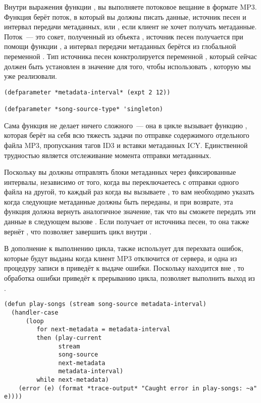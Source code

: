 Внутри выражения  функции , вы выполняете потоковое
вещание в формате MP3.  Функция  берёт поток, в который вы должны писать
данные, источник песен и интервал передачи метаданных, или , если клиент не
хочет получать метаданные.  Поток~--- это сокет, полученный из объекта ,
источник песен получается при помощи функции , а интервал передачи
метаданных берётся из глобальной переменной .  Тип источника
песен конктролируется переменной , который сейчас должен быть
установлен в значение  для того, чтобы использовать
, которую мы уже реализовали.

\begin{lstlisting}
(defparameter *metadata-interval* (expt 2 12))

(defparameter *song-source-type* 'singleton)
\end{lstlisting}

Сама функция  не делает ничего сложного~--- она в цикле вызывает функцию
, которая берёт на себя всю тяжесть задачи по отправке содержимого
отдельного файла MP3, пропускания тагов ID3 и вставки метаданных ICY.  Единственной
трудностью является отслеживание момента отправки метаданных.

Поскольку вы должны отправлять блоки метаданных через фиксированные интервалы, независимо
от того, когда вы переключаетесь с отправки одного файла на другой, то каждый раз когда вы
вызываете , то вам необходимо указать когда следующие метаданные должны
быть переданы, и при возврате, эта функция должна вернуть аналогичное значение, так что вы
сможете передать эти данные в следующем вызове .  Если
 получает  от источника песен, то она также вернёт
, что позволяет завершить цикл  внутри .

В дополнение к выполнению цикла,  также использует 
для перехвата ошибок, которые будут выданы когда клиент MP3 отключится от сервера, и одна
из процедуру записи в  приведёт к выдаче ошибки. Поскольку
 находится вне , то обработка ошибки приведёт к прерыванию
цикла, позволяет выполнить выход из .

\begin{lstlisting}
(defun play-songs (stream song-source metadata-interval)
  (handler-case 
      (loop
         for next-metadata = metadata-interval
         then (play-current 
               stream 
               song-source
               next-metadata
               metadata-interval)
         while next-metadata)
    (error (e) (format *trace-output* "Caught error in play-songs: ~a" e))))
\end{lstlisting}

